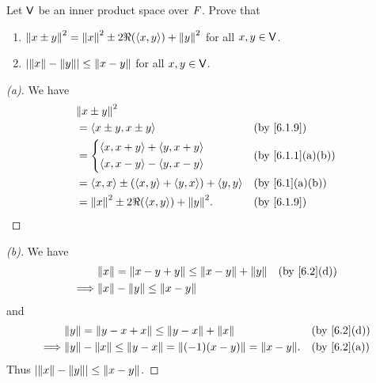 \begin{ex}\label{ex:6.1.19}
  Let \(\mathsf{V}\) be an inner product space over \(\mathit{F}\).
  Prove that
  \begin{enumerate}
    \item \(\left\lVert x \pm y\right\rVert^2 = \left\lVert x\right\rVert^2 \pm 2 \Re(\left\langle x, y\right\rangle) + \left\lVert y\right\rVert^2\) for all \(x, y \in \mathsf{V}\).
    \item \(\left\lvert\left\lVert x\right\rVert - \left\lVert y\right\rVert\right\rvert \leq \left\lVert x - y\right\rVert\) for all \(x, y \in \mathsf{V}\).
  \end{enumerate}
\end{ex}

\begin{proof}[(a)]
  We have
  \begin{align*}
     & \norm{x \pm y}^2                                                           \\
     & = \inn{x \pm y, x \pm y}                                &  & \by{6.1.9}    \\
     & = \begin{dcases}
           \inn{x, x + y} + \inn{y, x + y} \\
           \inn{x, x - y} - \inn{y, x - y}
         \end{dcases}                      &  & \by{6.1.1}[a,b]                   \\
     & = \inn{x, x} \pm (\inn{x, y} + \inn{y, x}) + \inn{y, y} &  & \by{6.1}[a,b] \\
     & = \norm{x}^2 \pm 2 \Re(\inn{x, y}) + \norm{y}^2.        &  & \by{6.1.9}
  \end{align*}
\end{proof}

\begin{proof}[(b)]
  We have
  \begin{align*}
             & \norm{x} = \norm{x - y + y} \leq \norm{x - y} + \norm{y} &  & \by{6.2}[d] \\
    \implies & \norm{x} - \norm{y} \leq \norm{x - y}
  \end{align*}
  and
  \begin{align*}
             & \norm{y} = \norm{y - x + x} \leq \norm{y - x} + \norm{x}                   &  & \by{6.2}[d] \\
    \implies & \norm{y} - \norm{x} \leq \norm{y - x} = \norm{(-1)(x - y)} = \norm{x - y}. &  & \by{6.2}[a]
  \end{align*}
  Thus \(\left\lvert\left\lVert x\right\rVert - \left\lVert y\right\rVert\right\rvert \leq \left\lVert x - y\right\rVert\).
\end{proof}

